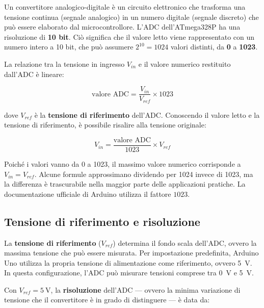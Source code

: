 Un convertitore analogico-digitale è un circuito elettronico che trasforma una tensione continua (segnale analogico) in un numero digitale (segnale discreto) che può essere elaborato dal microcontrollore. L'ADC dell'ATmega328P ha una risoluzione di \textbf{10 bit}. Ciò significa che il valore letto viene rappresentato con un numero intero a 10 bit, che può assumere $2^{10} = 1024$ valori distinti, da \textbf{0} a \textbf{1023}.

La relazione tra la tensione in ingresso $V_{in}$ e il valore numerico restituito dall'ADC è lineare:

\begin{equation}
    \text{valore ADC} = \frac{V_{in}}{V_{ref}} \times 1023
\end{equation}

dove $V_{ref}$ è la \textbf{tensione di riferimento} dell'ADC. Conoscendo il valore letto e la tensione di riferimento, è possibile risalire alla tensione originale:

\begin{equation}
    V_{in} = \frac{\text{valore ADC}}{1023} \times V_{ref}
\end{equation}

\begin{tcolorbox}[colback=blue!4, colframe=blue!60, title=\textbf{Nota – Il valore 1023}]
    Poiché i valori vanno da 0 a 1023, il massimo valore numerico corrisponde a $V_{in} = V_{ref}$. Alcune formule approssimano dividendo per 1024 invece di 1023, ma la differenza è trascurabile nella maggior parte delle applicazioni pratiche. La documentazione ufficiale di Arduino utilizza il fattore $1023$.
\end{tcolorbox}

\subsection*{Tensione di riferimento e risoluzione}

La \textbf{tensione di riferimento} ($V_{ref}$) determina il fondo scala dell'ADC, ovvero la massima tensione che può essere misurata. Per impostazione predefinita, Arduino Uno utilizza la propria tensione di alimentazione come riferimento, ovvero \SI{5}{\volt}. In questa configurazione, l'ADC può misurare tensioni comprese tra \SI{0}{\volt} e \SI{5}{\volt}.

Con $V_{ref} = \SI{5}{\volt}$, la \textbf{risoluzione} dell'ADC — ovvero la minima variazione di tensione che il convertitore è in grado di distinguere — è data da:

